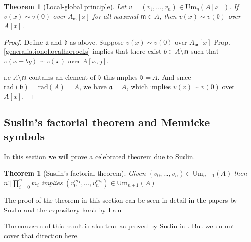\documentclass[12pt]{article}
\numberwithin{equation}{section}
\newcounter{dummy} \numberwithin{dummy}{section}
\newtheorem{theorem}[dummy]{Theorem}
\begin{document}
	\begin{theorem}[Local-global principle]\label{localglobalprinciple}
		Let $v = (v_1, \dots, v_n) \in \mathrm{Um}_n(A[x])$. If $v(x) \sim v(0)$ over $A_{\mathfrak{m}}[x]$ for all maximal $\mathfrak{m} \in A$, then $v(x) \sim v(0)$ over $A[x]$.
	\end{theorem}
	
	\begin{proof}
		Define $\mathfrak{a}$ and $\mathfrak{b}$ as above. Suppose $v(x) \sim v(0)$ over $A_\mathfrak{m}[x]$ Prop. \ref{generaliationoflocalhorrocks} implies that there exist $b \in A \setminus \mathfrak m$ such that $v(x+by) \sim v(x)$ over $A[x,y]$.
		
		i.e $A\setminus \mathfrak{m}$ contains an element of $\mathfrak{b}$ this implies $\mathfrak{b} = A$.  And since $\mathrm{rad}(\mathfrak{b})= \mathrm{rad}(A)=A$, we have $\mathfrak{a} = A$, which implies $v(x) \sim v(0)$ over $A[x]$.
	\end{proof}
		
		\subsection{Suslin's factorial theorem and Mennicke symbols}	
		In this section we will prove a celebrated theorem due to Suslin. \begin{theorem}[Suslin's factorial theorem]\label{suslinfactorial}
			Given $(v_0,\dots,v_n) \in \mathrm{Um}_{n+1}(A)$ then$n! | \prod_{i=0}^n m_i$ implies $(v_0^{m_1}, \dots, v_n^{m_n}) \in \mathrm{Um}_{n+1}(A)$ 
		\end{theorem}
			The proof of the theorem in this section can be seen in detail in the papers by Suslin \cite{suslin1977} and the expository book by Lam \cite{lam2010serre}. 
			
			The converse of this result is also true as proved by Suslin in \cite{suslin1982}. But we do not cover that direction here.
			
\end{document}
